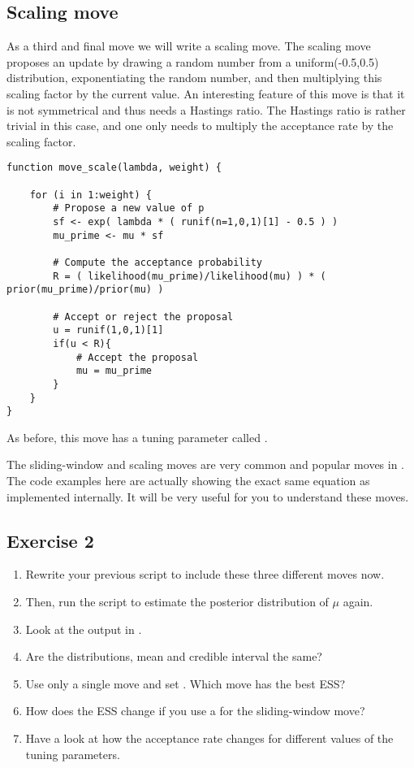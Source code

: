 \subsection{Scaling move}
As a third and final move we will write a scaling move.
The scaling move proposes an update by drawing a random number from a uniform(-0.5,0.5) distribution, exponentiating the random number, and then multiplying this scaling factor by the current value.
An interesting feature of this move is that it is not symmetrical and thus needs a Hastings ratio.
The Hastings ratio is rather trivial in this case, and one only needs to multiply the acceptance rate by the scaling factor.
{\tt \begin{snugshade*}
\begin{lstlisting}    
function move_scale(lambda, weight) {

    for (i in 1:weight) {
        # Propose a new value of p
        sf <- exp( lambda * ( runif(n=1,0,1)[1] - 0.5 ) )
        mu_prime <- mu * sf

        # Compute the acceptance probability
        R = ( likelihood(mu_prime)/likelihood(mu) ) * ( prior(mu_prime)/prior(mu) ) 

        # Accept or reject the proposal
        u = runif(1,0,1)[1] 
        if(u < R){
            # Accept the proposal
            mu = mu_prime 
        }
    }
}
\end{lstlisting}
\end{snugshade*}}
As before, this move has a tuning parameter called .

\begin{framed}
\IMPORANT The sliding-window and scaling moves are very common and popular moves in \RevBayes.
The code examples here are actually showing the exact same equation as implemented internally.
It will be very useful for you to understand these moves.	
\end{framed}


\subsection{Exercise 2}

\begin{enumerate}[label=\textnormal{Step \arabic*)}]
	\item Rewrite your previous script to include these three different moves now.
	\item Then, run the script to estimate the posterior distribution of $\mu$ again.
	\item Look at the output in \Tracer.
	\item Are the distributions, mean and credible interval the same?
	\item Use only a single move and set . Which move has the best ESS?
	\item How does the ESS change if you use a  for the sliding-window move?
	\item Have a look at how the acceptance rate changes for different values of the tuning parameters.
\end{enumerate}


